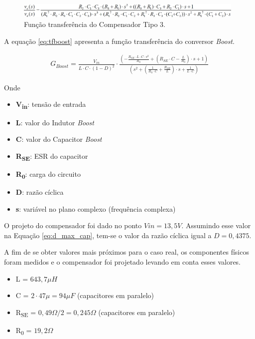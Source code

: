 \documentclass[a4paper]{article}
\begin{document}
{\begin{figure}[H]
	\centering
	\includegraphics[width=0.98\textwidth]{tf-comp.jpg}
	\caption{Função transferência do Compensador Tipo 3.}
	\label{fig:tf-comp}
\end{figure}

A equação \ref{eq:tfboost} apresenta a função transferência do conversor \emph{Boost}.

\begin{equation}
\label{eq:tfboost}
\begin{split}
G_{Boost} ={\frac{V_{in}}{L \cdot C \cdot \left(1-D\right)^{2}}} \cdot \frac{ \left( - \frac{R_{SE} \cdot L \cdot C \cdot s^2}{R_0} + \left( R_{SE} \cdot C - \frac{L}{R_0} \right) \cdot s+1 \right) }{\left( s^2 + \left( \frac{1}{R_0 \cdot C} + \frac{R_{SE}}{L} \right) \cdot s + \frac{1}{L \cdot C} \right)}
\end{split}
\end{equation}

Onde
\begin{itemize}
\item \textbf{V\textsubscript{in}}: tensão de entrada
\item \textbf{L}: valor do Indutor \emph{Boost}
\item \textbf{C}: valor do Capacitor \emph{Boost}
\item \textbf{R\textsubscript{SE}}: ESR do capacitor
\item \textbf{R\textsubscript{0}}: carga do circuito
\item \textbf{D}: razão cíclica
\item \textbf{s}: variável no plano complexo (frequência complexa)
\end{itemize}

O projeto do compensador foi dado no ponto $Vin = 13,5V$. Assumindo esse valor na Equação \ref{eq:d_max_cap}, tem-se o valor da razão cíclica igual a $D = 0,4375$.

A fim de se obter valores mais próximos para o caso real, os componentes físicos foram medidos e o compensador foi projetado levando em conta esses valores.

\begin{itemize}
\item L = $643,7\mu H$
\item C = $2 \cdot 47\mu = 94\mu F$ (capacitores em paralelo)
\item R\textsubscript{SE} = $0,49 \Omega / 2 = 0,245 \Omega$ (capacitores em paralelo)
\item R\textsubscript{0} = $19,2 \Omega$
\end{itemize}

}
\end{document}
